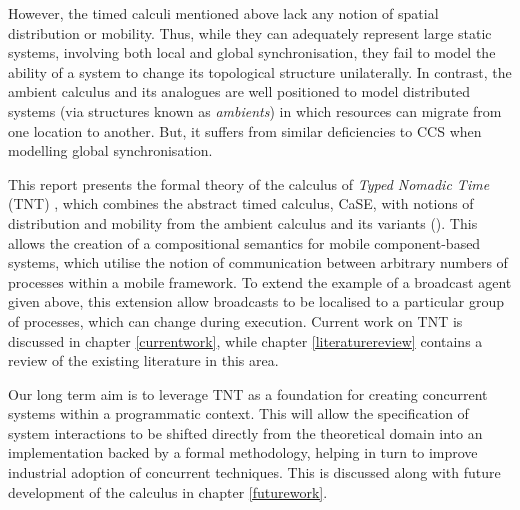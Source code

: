 However, the timed calculi mentioned above lack any notion of spatial
distribution or mobility. Thus, while they can adequately represent
large static systems, involving both local and global synchronisation,
they fail to model the ability of a system to change its topological
structure unilaterally. In contrast, the ambient calculus \cite{amb} and
its analogues are well positioned to model distributed systems (via
structures known as \emph{ambients}) in which resources can migrate from
one location to another. But, it suffers from similar deficiencies to
CCS when modelling global synchronisation.

This report presents the formal theory of the calculus of \emph{Typed
Nomadic Time} (TNT) \cite{hughes:nt}, which combines the abstract timed
calculus, CaSE, with notions of distribution and mobility from the
ambient calculus and its variants
(\cite{sangiorgi:mobsafeambients,controlledamb02}).  This allows the
creation of a compositional semantics for mobile component-based
systems, which utilise the notion of communication between arbitrary
numbers of processes within a mobile framework.  To extend the example
of a broadcast agent given above, this extension allow broadcasts to be
localised to a particular group of processes, which can change during
execution.  Current work on TNT is discussed in chapter
\ref{currentwork}, while chapter \ref{literaturereview} contains a
review of the existing literature in this area.  

Our long term aim is to leverage TNT as a foundation for creating
concurrent systems within a programmatic context. This will allow the
specification of system interactions to be shifted directly from the
theoretical domain into an implementation backed by a formal
methodology, helping in turn to improve industrial adoption of
concurrent techniques.  This is discussed along with future development
of the calculus in chapter \ref{futurework}.
